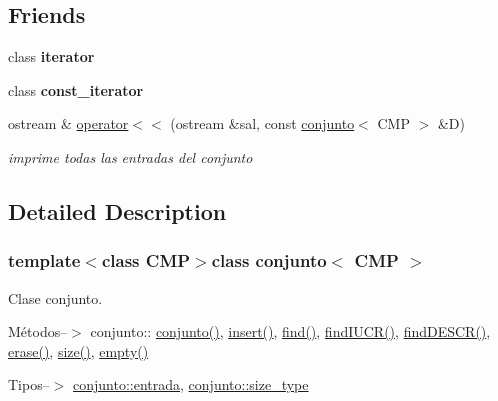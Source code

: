\subsection*{Friends}
\begin{DoxyCompactItemize}
\item 
\hypertarget{classconjunto_a67171474c4da6cc8efe0c7fafefd2b2d}{class {\bfseries iterator}}\label{classconjunto_a67171474c4da6cc8efe0c7fafefd2b2d}

\item 
\hypertarget{classconjunto_ac220ce1c155db1ac44146c12d178056f}{class {\bfseries const\-\_\-iterator}}\label{classconjunto_ac220ce1c155db1ac44146c12d178056f}

\item 
ostream \& \hyperlink{classconjunto_ac8c9ade2724af359786f5f9ce0498e02}{operator$<$$<$} (ostream \&sal, const \hyperlink{classconjunto}{conjunto}$<$ C\-M\-P $>$ \&D)
\begin{DoxyCompactList}\small\item\em imprime todas las entradas del conjunto \end{DoxyCompactList}\end{DoxyCompactItemize}


\subsection{Detailed Description}
\subsubsection*{template$<$class C\-M\-P$>$class conjunto$<$ C\-M\-P $>$}

Clase conjunto. 

Métodos--$>$ conjunto\-:\-: \hyperlink{classconjunto_ab634a250097d154d69a13bf8bde9fec7}{conjunto()}, \hyperlink{classconjunto_a61c22092268cc91439b93a2fd96e4173}{insert()}, \hyperlink{classconjunto_a725ddba7aa25ad0576f13000e035ee6f}{find()}, \hyperlink{classconjunto_a076dc70516af91c07b570bca24c6d9f7}{find\-I\-U\-C\-R()}, \hyperlink{classconjunto_ab4f2fdce330e5b53c3ac8f529ccd435d}{find\-D\-E\-S\-C\-R()}, \hyperlink{classconjunto_a92332298c1202e92027b48f01c69ae91}{erase()}, \hyperlink{classconjunto_aa2d78be0b9fd7aecf1fccf9ad502b907}{size()}, \hyperlink{classconjunto_a904716d6ae739f0461880b08138cf4e4}{empty()}

Tipos--$>$ \hyperlink{classconjunto_a7630ace7cb17bcec07daf5804f1a0780}{conjunto\-::entrada}, \hyperlink{classconjunto_a0cc9902da62790ec2a6d59f4559c2df5}{conjunto\-::size\-\_\-type}

